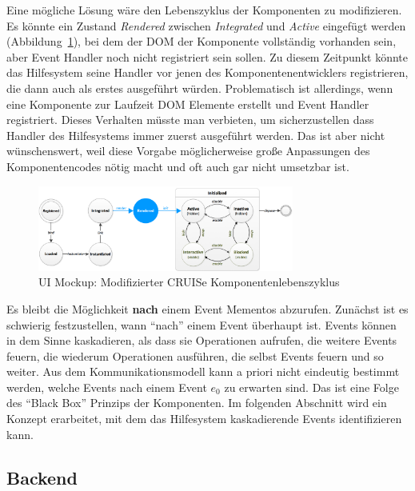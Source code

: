 \documentclass[
	headsepline,
	footsepline,
	fontsize=12pt,
	bibliography=totoc
]{scrbook}
\begin{document}
Eine mögliche Lösung wäre den Lebenszyklus der Komponenten zu modifizieren. Es könnte ein Zustand \emph{Rendered} zwischen \emph{Integrated} und \emph{Active} eingefügt werden (Abbildung~\ref{figure:cruise-lifecycle}), bei dem der DOM der Komponente vollständig vorhanden sein, aber Event Handler noch nicht registriert sein sollen. Zu diesem Zeitpunkt könnte das Hilfesystem seine Handler vor jenen des Komponentenentwicklers registrieren, die dann auch als erstes ausgeführt würden. Problematisch ist allerdings, wenn eine Komponente zur Laufzeit DOM Elemente erstellt und Event Handler registriert. Dieses Verhalten müsste man verbieten, um sicherzustellen dass Handler des Hilfesystems immer zuerst ausgeführt werden. Das ist aber nicht wünschenswert, weil diese Vorgabe möglicherweise große Anpassungen des Komponentencodes nötig macht und oft auch gar nicht umsetzbar ist.

\begin{figure}[htbp]
   \centering
   \includegraphics[width=0.75\textwidth]{images/konzeption-cruise-lifecycle.png}
   \caption{UI Mockup: Modifizierter CRUISe Komponentenlebenszyklus}
   \label{figure:cruise-lifecycle}
\end{figure}


Es bleibt die Möglichkeit \textbf{nach} einem Event Mementos abzurufen. Zunächst ist es schwierig festzustellen, wann \enquote{nach} einem Event überhaupt ist. Events können in dem Sinne kaskadieren, als dass sie Operationen aufrufen, die weitere Events feuern, die wiederum Operationen ausführen, die selbst Events feuern und so weiter. Aus dem Kommunikationsmodell kann a priori nicht eindeutig bestimmt werden, welche Events nach einem Event $e_0$ zu erwarten sind. Das ist eine Folge des \enquote{Black Box} Prinzips der Komponenten. Im folgenden Abschnitt wird ein Konzept erarbeitet, mit dem das Hilfesystem kaskadierende Events identifizieren kann.

\subsection{Backend}
\end{document}
